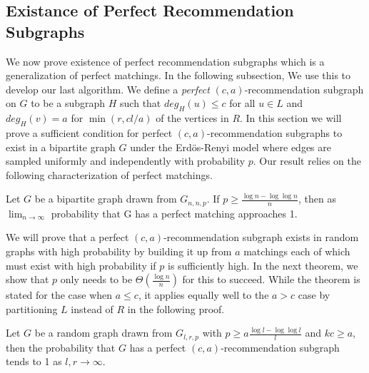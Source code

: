 \subsection{Existance of Perfect Recommendation Subgraphs}
We now prove existence of perfect recommendation subgraphs which is a generalization
of perfect matchings. In the following subsection, We use this to develop our last algorithm.
We define a \emph{perfect} $(c,a)$-recommendation subgraph on $G$ to be a subgraph $H$ such that
$deg_H(u)\leq c$ for all $u\in L$ and $deg_H(v)=a$ for
$\min(r,cl/a)$ of the vertices in $R$. In this section we will
prove a sufficient condition for perfect $(c,a)$-recommendation
subgraphs to exist in a bipartite graph $G$ under the Erd\"os-Renyi model\cite{ErdosRenyi59} where edges are sampled
uniformly and independently with probability $p$. Our result relies on
the following characterization of perfect matchings.

\begin{thm}\cite{Janson2011}
\label{random_matching_threshold}
Let $G$ be a bipartite graph drawn from $G_{n, n, p}$. If $p \geq \frac{\log n -
\log\log n}{n}$, then as $\lim_{n\to\infty}$ probability that G has a perfect
    matching approaches 1.
\end{thm}

We will prove that a perfect $(c,a)$-recommendation subgraph exists in
random graphs with high probability by building it up from $a$
matchings each of which must exist with high probability if $p$ is
sufficiently high. In the next theorem, we show that $p$ only needs to
be $\Theta(\frac{\log n}{n})$ for this to succeed. While the theorem is stated for
the case when $a \leq c$, it applies equally well to the $a > c$
case by partitioning $L$ instead of $R$ in the following proof.

\begin{thm}
Let $G$ be a random graph drawn from $G_{l, r, p}$ with $p\geq a\frac{\log l-\log\log
l}{l}$ and $kc \geq a$, then the probability that $G$ has a perfect $(c, a)$-recommendation
subgraph tends to 1 as $l,r\to\infty$.
\end{thm}

